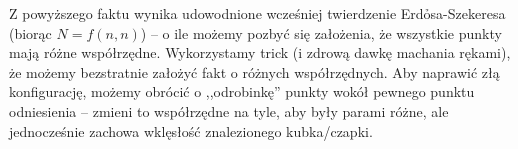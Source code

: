 Z powyższego faktu wynika udowodnione wcześniej twierdzenie Erd\h{o}sa-Szekeresa (biorąc $N = f(n,n)$) -- o ile możemy pozbyć się założenia, że wszystkie punkty mają różne współrzędne.
Wykorzystamy trick (i zdrową dawkę machania rękami), że możemy bezstratnie założyć fakt o różnych współrzędnych.
Aby naprawić złą konfigurację, możemy obrócić o ,,odrobinkę'' punkty wokół pewnego punktu odniesienia --
zmieni to współrzędne na tyle, aby były parami różne, ale jednocześnie zachowa wklęsłość znalezionego kubka/czapki.
